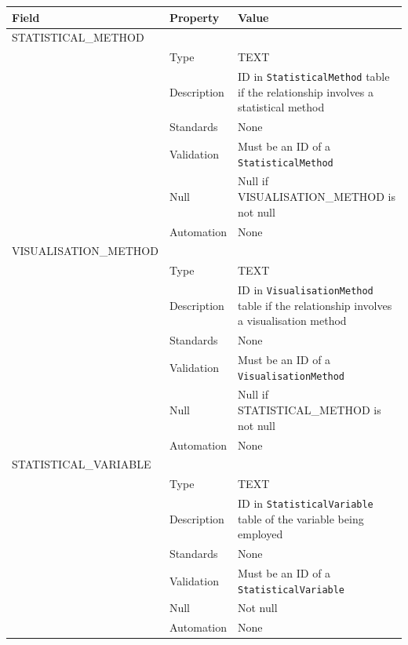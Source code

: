 \documentclass[
]{article}
\newcounter{none} %
\begin{document}
{\def\LTcaptype{none} %
\begin{longtable}[]{@{}
  >{\raggedright\arraybackslash}p{}
  >{\raggedright\arraybackslash}p{}
  >{\raggedright\arraybackslash}p{}@{}}
\toprule\noalign{}
\begin{minipage}[b]{\linewidth}\raggedright
Field
\end{minipage} & \begin{minipage}[b]{\linewidth}\raggedright
Property
\end{minipage} & \begin{minipage}[b]{\linewidth}\raggedright
Value
\end{minipage} \\
\midrule\noalign{}
\endhead
\bottomrule\noalign{}
\endlastfoot
STATISTICAL\_METHOD & & \\
& Type & TEXT \\
& Description & ID in \texttt{StatisticalMethod} table if the
relationship involves a statistical method \\
& Standards & None \\
& Validation & Must be an ID of a \texttt{StatisticalMethod} \\
& Null & Null if VISUALISATION\_METHOD is not null \\
& Automation & None \\
VISUALISATION\_METHOD & & \\
& Type & TEXT \\
& Description & ID in \texttt{VisualisationMethod} table if the
relationship involves a visualisation method \\
& Standards & None \\
& Validation & Must be an ID of a \texttt{VisualisationMethod} \\
& Null & Null if STATISTICAL\_METHOD is not null \\
& Automation & None \\
STATISTICAL\_VARIABLE & & \\
& Type & TEXT \\
& Description & ID in \texttt{StatisticalVariable} table of the variable
being employed \\
& Standards & None \\
& Validation & Must be an ID of a \texttt{StatisticalVariable} \\
& Null & Not null \\
& Automation & None \\
\end{longtable}
}
\end{document}

